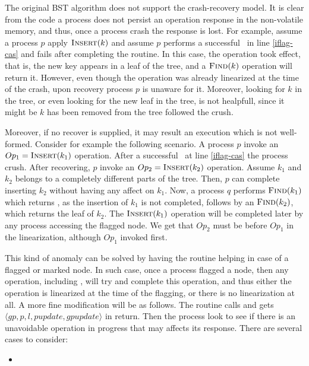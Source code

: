 

The original BST algorithm does not support the crash-recovery model. It is clear from the code a process does not persist an operation response in the non-volatile memory, and thus, once a process crash the response is lost. For example, assume a process $p$ apply $\mbox{\sc Insert} (k)$ and assume $p$ performs a successful \CASB\ in line \ref{iflag-cas} and fails after completing the  routine. In this case, the  operation took effect, that is, the new key appears in a leaf of the tree, and a $\mbox{\sc Find} (k)$ operation will return it. However, even though the operation was already linearized at the time of the crash, upon recovery process $p$ is unaware for it. Moreover, looking for $k$ in the tree, or even looking for the new leaf in the tree, is not healpfull, since it might be $k$ has been removed from the tree followed the crush.

Moreover, if no recover is supplied, it may result an execution which is not well-formed. Consider for example the following scenario. A process $p$ invoke an $Op_1 = \mbox{\sc Insert}(k_1)$ operation. After a successful \CASB\ at line \ref{iflag-cas} the process crush. After recovering, $p$ invoke an $Op_2 = \mbox{\sc Insert}(k_2)$ operation. Assume $k_1$ and $k_2$ belongs to a completely different parts of the tree. Then, $p$ can complete inserting $k_2$ without having any affect on $k_1$. Now, a process $q$ performs $\mbox{\sc Find}(k_1)$ which returns \NULL, as the insertion of $k_1$ is not completed, follows by an $\mbox{\sc Find}(k_2)$, which returns the leaf of $k_2$. The $\mbox{\sc Insert}(k_1)$ operation will be completed later by any process accessing the flagged node. We get that $Op_2$ must be before $Op_1$ in the linearization, although $Op_1$ invoked first.

This kind of anomaly can be solved by having the  routine helping in case of a flagged or marked node. In such case, once a process flagged a node, then any operation, including , will try and complete this operation, and thus either the operation is linearized at the time of the flagging, or there is no linearization at all. A more fine modification will be as follows. The routine  calls  and gets $\langle gp, p, l, pupdate, gpupdate \rangle$ in return. Then the process look to see if there is an unavoidable operation in progress that may affects its response. There are several cases to consider:
\begin{itemize}
	\item 
\end{itemize}


